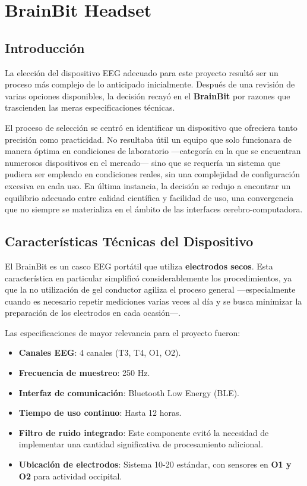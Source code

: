 \chapter{BrainBit Headset}

\section{Introducci\'on}
La elección del dispositivo EEG adecuado para este proyecto resultó ser un proceso más complejo de lo anticipado inicialmente. Después de una revisión de varias opciones disponibles, la decisión recayó en el \textbf{BrainBit} \cite{brainbit} por razones que trascienden las meras especificaciones técnicas.

El proceso de selección se centró en identificar un dispositivo que ofreciera tanto precisión como practicidad. No resultaba útil un equipo que solo funcionara de manera óptima en condiciones de laboratorio —categoría en la que se encuentran numerosos dispositivos en el mercado— sino que se requería un sistema que pudiera ser empleado en condiciones reales, sin una complejidad de configuración excesiva en cada uso. En última instancia, la decisión se redujo a encontrar un equilibrio adecuado entre calidad científica y facilidad de uso, una convergencia que no siempre se materializa en el ámbito de las interfaces cerebro-computadora.

\section{Características Técnicas del Dispositivo}
El BrainBit es un casco EEG portátil que utiliza \textbf{electrodos secos}. Esta característica en particular simplificó considerablemente los procedimientos, ya que la no utilización de gel conductor agiliza el proceso general —especialmente cuando es necesario repetir mediciones varias veces al día y se busca minimizar la preparación de los electrodos en cada ocasión—.

Las especificaciones de mayor relevancia para el proyecto fueron:

    \begin{itemize}
        \item \textbf{Canales EEG}: 4 canales (T3, T4, O1, O2).
        \item \textbf{Frecuencia de muestreo}: 250 Hz.
        \item \textbf{Interfaz de comunicación}: Bluetooth Low Energy (BLE).
        \item \textbf{Tiempo de uso continuo}: Hasta 12 horas.
        \item \textbf{Filtro de ruido integrado}: Este componente evitó la necesidad de implementar una cantidad significativa de procesamiento adicional.
        \item \textbf{Ubicación de electrodos}: Sistema 10-20 estándar, con sensores en \textbf{O1 y O2} para actividad occipital.
    \end{itemize}

